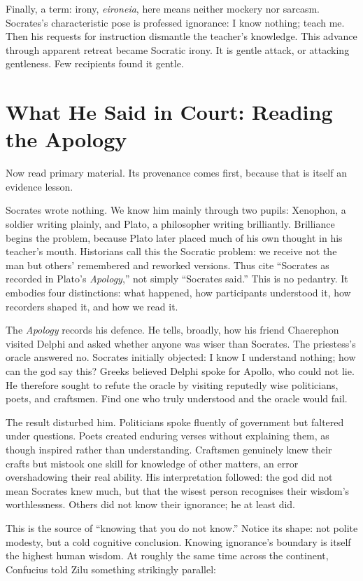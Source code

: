 Finally, a term: irony, \textit{eironeia}, here means neither mockery nor sarcasm. Socrates's characteristic pose is professed ignorance: I know nothing; teach me. Then his requests for instruction dismantle the teacher's knowledge. This advance through apparent retreat became Socratic irony. It is gentle attack, or attacking gentleness. Few recipients found it gentle.

\section[In Court: Reading the Apology]{What He Said in Court: Reading the Apology}
Now read primary material. Its provenance comes first, because that is itself an evidence lesson.

Socrates wrote nothing. We know him mainly through two pupils: Xenophon, a soldier writing plainly, and Plato, a philosopher writing brilliantly. Brilliance begins the problem, because Plato later placed much of his own thought in his teacher's mouth. Historians call this the Socratic problem: we receive not the man but others' remembered and reworked versions. Thus cite ``Socrates as recorded in Plato's \textit{Apology},'' not simply ``Socrates said.'' This is no pedantry. It embodies four distinctions: what happened, how participants understood it, how recorders shaped it, and how we read it.

The \textit{Apology} records his defence. He tells, broadly, how his friend Chaerephon visited Delphi and asked whether anyone was wiser than Socrates. The priestess's oracle answered no. Socrates initially objected: I know I understand nothing; how can the god say this? Greeks believed Delphi spoke for Apollo, who could not lie. He therefore sought to refute the oracle by visiting reputedly wise politicians, poets, and craftsmen. Find one who truly understood and the oracle would fail.

The result disturbed him. Politicians spoke fluently of government but faltered under questions. Poets created enduring verses without explaining them, as though inspired rather than understanding. Craftsmen genuinely knew their crafts but mistook one skill for knowledge of other matters, an error overshadowing their real ability. His interpretation followed: the god did not mean Socrates knew much, but that the wisest person recognises their wisdom's worthlessness. Others did not know their ignorance; he at least did.

This is the source of ``knowing that you do not know.'' Notice its shape: not polite modesty, but a cold cognitive conclusion. Knowing ignorance's boundary is itself the highest human wisdom. At roughly the same time across the continent, Confucius told Zilu something strikingly parallel:

